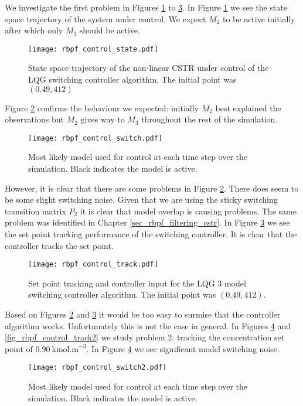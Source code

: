 We investigate the first problem in Figures \ref{fig_rbpf_control_state} to \ref{fig_rbpf_control_track}. In Figure \ref{fig_rbpf_control_state} we see the state space trajectory of the system under control. We expect $M_2$ to be active initially after which only $M_3$ should be active.
\begin{figure}[H] 
\centering
\texttt{[image: rbpf\_control\_state.pdf]}
\caption{State space trajectory of the non-linear CSTR under control of the LQG switching controller algorithm. The initial point was $(0.49, 412)$}
\label{fig_rbpf_control_state}
\end{figure}
Figure \ref{fig_rbpf_control_switch} confirms the behaviour we expected: initially $M_2$ best explained the observations but $M_2$ gives way to $M_3$ throughout the rest of the simulation.   
\begin{figure}[H] 
\centering
\texttt{[image: rbpf\_control\_switch.pdf]}
\caption{Most likely model used for control at each time step over the simulation. Black indicates the model is active.}
\label{fig_rbpf_control_switch}
\end{figure}
However, it is clear that there are some problems in Figure \ref{fig_rbpf_control_switch}. There does seem to be some slight switching noise. Given that we are using the sticky switching transition matrix $P_2$ it is clear that model overlap is causing problems. The same problem was identified in Chapter \ref{sec_rbpf_filtering_cstr}. In Figure \ref{fig_rbpf_control_track} we see the set point tracking performance of the switching controller. It is clear that the controller tracks the set point.
\begin{figure}[H] 
\centering
\texttt{[image: rbpf\_control\_track.pdf]}
\caption{Set point tracking and controller input for the LQG 3 model switching controller algorithm. The initial point was $(0.49, 412)$.}
\label{fig_rbpf_control_track}
\end{figure}
Based on Figures \ref{fig_rbpf_control_switch} and \ref{fig_rbpf_control_track} it would be too easy to surmise that the controller algorithm works. Unfortunately this is not the case in general. In Figures \ref{fig_rbpf_control_switch2} and \ref{fig_rbpf_control_track2} we study problem 2: tracking the concentration set point of $0.90~\text{kmol.m}^{-3}$. In Figure \ref{fig_rbpf_control_switch2} we see significant model switching noise.
\begin{figure}[H] 
\centering
\texttt{[image: rbpf\_control\_switch2.pdf]}
\caption{Most likely model used for control at each time step over the simulation. Black indicates the model is active.}
\label{fig_rbpf_control_switch2}
\end{figure}
